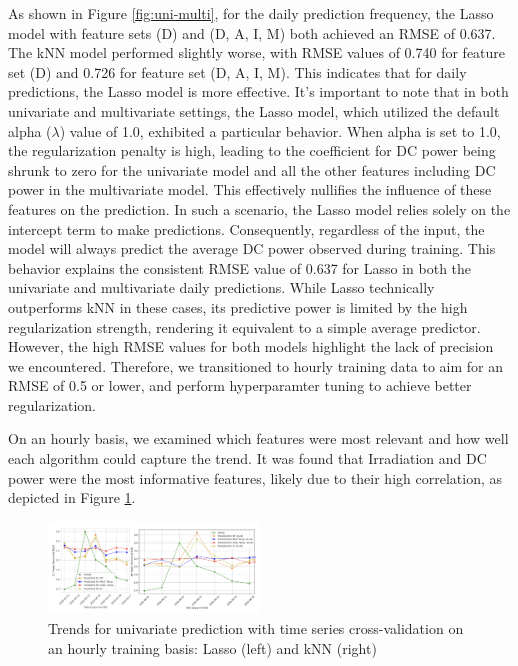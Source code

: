 As shown in Figure \ref{fig:uni-multi}, for the daily prediction frequency, the Lasso model with feature sets (D) and (D, A, I, M) both achieved an RMSE of 0.637. The kNN model performed slightly worse, with RMSE values of 0.740 for feature set (D) and 0.726 for feature set (D, A, I, M). This indicates that for daily predictions, the Lasso model is more effective. It's important to note that in both univariate and multivariate settings, the Lasso model, which utilized the default alpha (\(\lambda\)) value of 1.0, exhibited a particular behavior. When alpha is set to 1.0, the regularization penalty is high, leading to the coefficient for DC power being shrunk to zero for the univariate model and all the other features including DC power in the multivariate model. This effectively nullifies the influence of these features on the prediction. In such a scenario, the Lasso model relies solely on the intercept term to make predictions. Consequently, regardless of the input, the model will always predict the average DC power observed during training.
This behavior explains the consistent RMSE value of 0.637 for Lasso in both the univariate and multivariate daily predictions. While Lasso technically outperforms kNN in these cases, its predictive power is limited by the high regularization strength, rendering it equivalent to a simple average predictor. However, the high RMSE values for both models highlight the lack of precision we encountered. Therefore, we transitioned to hourly training data to aim for an RMSE of 0.5 or lower, and perform hyperparamter tuning to achieve better regularization.

On an hourly basis, we examined which features were most relevant and how well each algorithm could capture the trend. It was found that Irradiation and DC power were the most informative features, likely due to their high correlation, as depicted in Figure \ref{fig:hourDC}.

\begin{figure}[h]
    \centering
    \includegraphics[width=0.5\textwidth]{Figures/hourDC.png}
    \caption{Trends for univariate prediction with time series cross-validation on an hourly training basis: Lasso (left) and kNN (right)}
    \label{fig:hourDC}
\end{figure}

